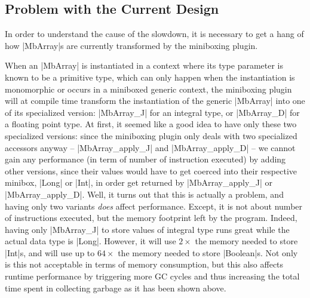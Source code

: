 \subsection{Problem with the Current Design}

In order to understand the cause of the slowdown, it is necessary to get a hang of how |MbArray|s are currently transformed by the miniboxing plugin.

When an |MbArray| is instantiated in a context where its type parameter is known to be a primitive type, which can only happen when the instantiation is monomorphic or occurs in a miniboxed generic context, the miniboxing plugin will at compile time transform the instantiation of the generic |MbArray| into one of its specialized version: |MbArray_J| for an integral type, or |MbArray_D| for a floating point type.
At first, it seemed like a good idea to have only these two specialized versions: since the miniboxing plugin only deals with two specialized accessors anyway -- |MbArray_apply_J| and |MbArray_apply_D| -- we cannot gain any performance (in term of number of instruction executed) by adding other versions, since their values would have to get coerced into their respective minibox, |Long| or |Int|, in order get returned by |MbArray_apply_J| or |MbArray_apply_D|.  
Well, it turns out that this is actually a problem, and having only two variants \emph{does} affect performance. Except, it is not about number of instructions executed, but the memory footprint left by the program. Indeed, having only |MbArray_J| to store values of integral type runs great while the actual data type is |Long|. However, it will use $2\times$ the memory needed to store |Int|s, and will use up to $64\times$ the memory needed to store |Boolean|s. Not only is this not acceptable in terms of memory consumption, but this also affects runtime performance by triggering more GC cycles and thus increasing the total time spent in collecting garbage as it has been shown above.


